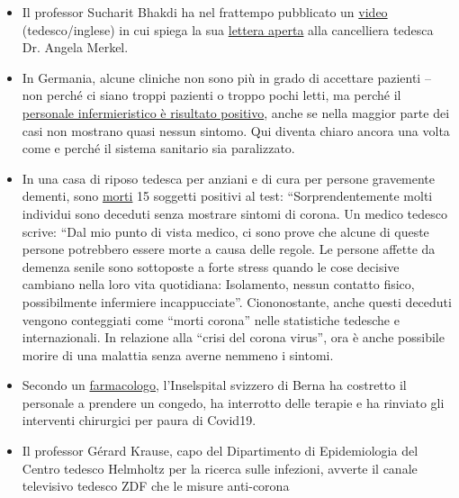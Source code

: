 \begin{itemize}
\tightlist
\item
  Il professor Sucharit Bhakdi ha nel frattempo pubblicato un
  \href{https://www.youtube.com/watch?v=LsExPrHCHbw\&feature=emb_title}{video}
  (tedesco/inglese) in cui spiega la sua
  \href{https://swprs.org/offener-brief-von-professor-sucharit-bhakdi-an-bundeskanzlerin-dr-angela-merkel/}{lettera
  aperta} alla cancelliera tedesca Dr. Angela Merkel.
\item
  In Germania, alcune cliniche non sono più in grado di accettare
  pazienti -- non perché ci siano troppi pazienti o troppo pochi letti,
  ma perché il
  \href{https://web.archive.org/web/20200330082928/https:/www.sueddeutsche.de/panorama/coronavirus-news-deutschland-wolfsburg-laschet-1.4828033}{personale
  infermieristico è risultato positivo}, anche se nella maggior parte
  dei casi non mostrano quasi nessun sintomo. Qui diventa chiaro ancora
  una volta come e perché il sistema sanitario sia paralizzato.
\item
  In una casa di riposo tedesca per anziani e di cura per persone
  gravemente dementi, sono
  \href{https://web.archive.org/web/20200330082928/https:/www.sueddeutsche.de/panorama/coronavirus-news-deutschland-wolfsburg-laschet-1.4828033}{morti}
  15 soggetti positivi al test: ``Sorprendentemente molti individui sono
  deceduti senza mostrare sintomi di corona. Un medico tedesco scrive:
  ``Dal mio punto di vista medico, ci sono prove che alcune di queste
  persone potrebbero essere morte a causa delle regole. Le persone
  affette da demenza senile sono sottoposte a forte stress quando le
  cose decisive cambiano nella loro vita quotidiana: Isolamento, nessun
  contatto fisico, possibilmente infermiere incappucciate''.
  Ciononostante, anche questi deceduti vengono conteggiati come ``morti
  corona'' nelle statistiche tedesche e internazionali. In relazione
  alla ``crisi del corona virus'', ora è anche possibile morire di una
  malattia senza averne nemmeno i sintomi. 
\item
  Secondo un
  \href{https://twitter.com/sneatio/status/1244157986832101376}{farmacologo},
  l'Inselspital svizzero di Berna ha costretto il personale a prendere
  un congedo, ha interrotto delle terapie e ha rinviato gli interventi
  chirurgici per paura di Covid19.
\item
  Il professor Gérard Krause, capo del Dipartimento di Epidemiologia del
  Centro tedesco Helmholtz per la ricerca sulle infezioni, avverte il
  canale televisivo tedesco ZDF che le misure anti-corona

\end{itemize}
